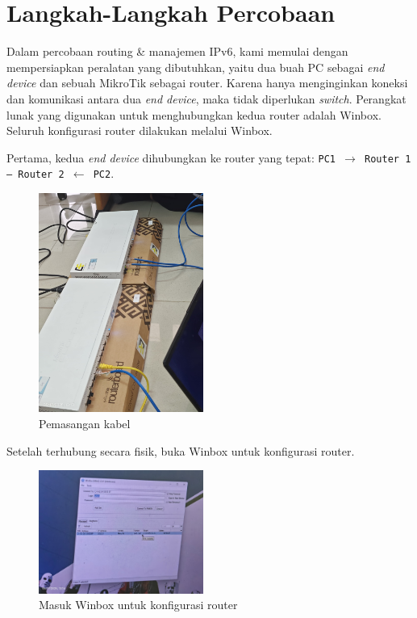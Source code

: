 
\section{Langkah-Langkah Percobaan}

Dalam percobaan routing \& manajemen IPv6, kami memulai dengan mempersiapkan peralatan yang dibutuhkan, yaitu dua buah PC sebagai \textit{end device} dan sebuah MikroTik sebagai router. Karena hanya menginginkan koneksi dan komunikasi antara dua \textit{end device}, maka tidak diperlukan \textit{switch}. Perangkat lunak yang digunakan untuk menghubungkan kedua router adalah Winbox. Seluruh konfigurasi router dilakukan melalui Winbox.

Pertama, kedua \textit{end device} dihubungkan ke router yang tepat: \texttt{PC1 $\rightarrow$ Router\,1 — Router\,2 $\leftarrow$ PC2}.

\begin{figure}[H]
    \centering
    \includegraphics[width=0.48\textwidth]{img/Pasang.jpeg}
    \caption{Pemasangan kabel}
    \label{fig:pasang}
\end{figure}

Setelah terhubung secara fisik, buka Winbox untuk konfigurasi router.

\begin{figure}[H]
    \centering
    \includegraphics[width=0.48\textwidth]{img/winbox.jpeg}
    \caption{Masuk Winbox untuk konfigurasi router}
    \label{fig:winbox}
\end{figure}

